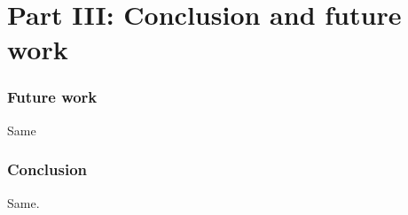 \section{Part III: Conclusion and future work}

\begin{frame}
  \frametitle{Future work}
Same
\end{frame}


\begin{frame}
  \frametitle{Conclusion}
Same.
\end{frame}
